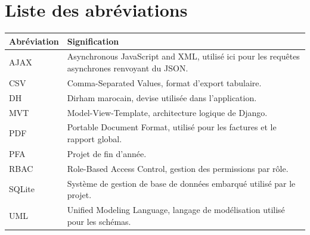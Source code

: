 \chapter*{Liste des abréviations}

\begin{longtable}{|p{3cm}|p{10cm}|}
\hline
\textbf{Abréviation} & \textbf{Signification} \\
\hline
AJAX & Asynchronous JavaScript and XML, utilisé ici pour les requêtes asynchrones renvoyant du JSON. \\
\hline
CSV & Comma-Separated Values, format d'export tabulaire. \\
\hline
DH & Dirham marocain, devise utilisée dans l'application. \\
\hline
MVT & Model-View-Template, architecture logique de Django. \\
\hline
PDF & Portable Document Format, utilisé pour les factures et le rapport global. \\
\hline
PFA & Projet de fin d'année. \\
\hline
RBAC & Role-Based Access Control, gestion des permissions par rôle. \\
\hline
SQLite & Système de gestion de base de données embarqué utilisé par le projet. \\
\hline
UML & Unified Modeling Language, langage de modélisation utilisé pour les schémas. \\
\hline
\end{longtable}
\clearpage
